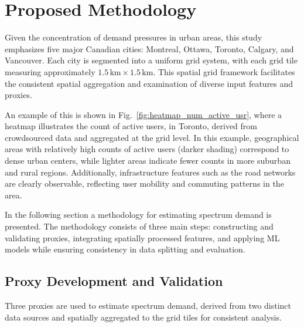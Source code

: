 \documentclass[conference]{IEEEtran}
\begin{document}
\section{Proposed Methodology}
\label{sec:proposed_methodology}

Given the concentration of demand pressures in urban areas, this study emphasizes five major Canadian cities: Montreal, Ottawa, Toronto, Calgary, and Vancouver. Each city is segmented into a uniform grid system, with each grid tile measuring approximately $1.5\,\text{km} \times 1.5\,\text{km}$. This spatial grid framework facilitates the consistent spatial aggregation and examination of diverse input features and proxies.

An example of this is shown in Fig.~\ref{fig:heatmap_num_active_usr}, where a heatmap illustrates the count of active users, in Toronto, derived from crowdsourced data and aggregated at the grid level. In this example, geographical areas with relatively high counts of active users (darker shading) correspond to dense urban centers, while lighter areas indicate fewer counts in more suburban and rural regions. Additionally, infrastructure features such as the road networks are clearly observable, reflecting user mobility and commuting patterns in the area.

In the following section a methodology for estimating spectrum demand is presented.  The methodology consists of three main steps: constructing and validating proxies, integrating spatially processed features, and applying ML models while ensuring consistency in data splitting and evaluation.

\subsection{Proxy Development and Validation}
Three proxies are used to estimate spectrum demand, derived from two distinct data sources and spatially aggregated to the grid tiles for consistent analysis.
\end{document}
